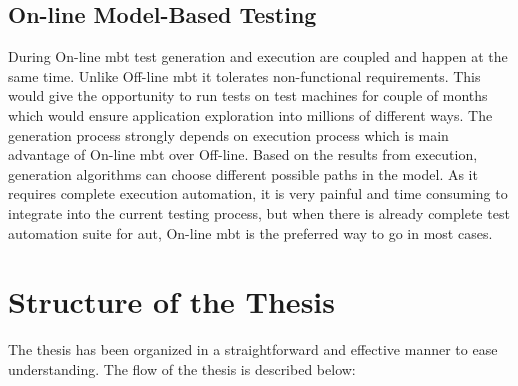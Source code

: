 \subsection{On-line Model-Based Testing}
During On-line \acrlong{mbt} test generation and execution are coupled and happen at the same time. Unlike Off-line \acrlong{mbt} it tolerates non-functional requirements. This would give the opportunity to run tests on test machines for couple of months which would ensure application exploration into millions of different ways. The generation process strongly depends on execution process which is main advantage of On-line \acrlong{mbt} over Off-line. Based on the results from execution, generation algorithms can choose different possible paths in the model. As it requires complete execution automation, it is very painful and time consuming to integrate into the current testing process, but when there is already complete test automation suite for \acrlong{aut}, On-line \acrlong{mbt} is the preferred way to go in most cases.


\section{Structure of the Thesis}
The thesis has been organized in a straightforward and effective manner to ease understanding. The flow of the thesis is described below:

